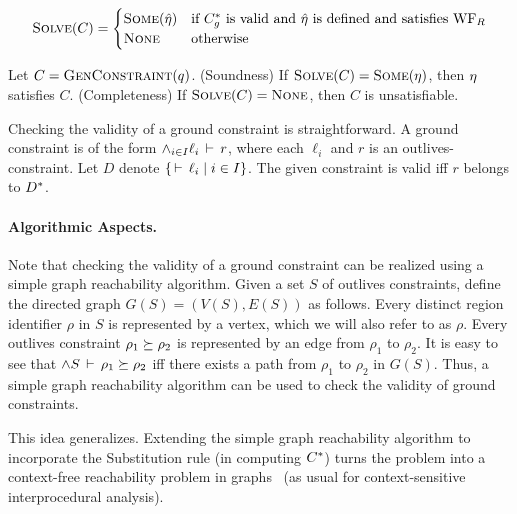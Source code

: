 
\[
\textsc{Solve}(C) = 
\begin{cases}
\textsc{Some} (\hat{\eta}) & \textrm{if ${C}^*_g$ is valid and $\hat{\eta}$ is defined and satisfies $\text{WF}_R$} \\
\textsc{None} & \textrm{otherwise}
\end{cases}
\]

\begin{theorem}
\label{thm:constraint-solver-sc}
Let $C = \textsc{GenConstraint}(q)$.
(Soundness) If $\textsc{Solve}(C) = \textsc{Some}(\eta)$, then $\eta$ satisfies $C$.
(Completeness) If $\textsc{Solve}(C) = \textsc{None}$, then $C$ is unsatisfiable.
\end{theorem}

Checking the validity of a ground constraint is straightforward.
A ground constraint is of the form $\wedge_{i \in I} \ell_i\,\vdash\,r$, where each
$\ell_i$ and $r$ is an outlives-constraint.
Let $D$ denote $\{ \,\vdash\,\ell_i \;|\; i \in I \}$.
The given constraint is valid iff $r$ belongs to ${D}^*$.

\paragraph{Algorithmic Aspects.}
Note that checking the validity of a ground constraint can be realized using
a simple graph reachability algorithm.
%
Given a set $S$ of outlives constraints, define the directed
graph $G(S)=(V(S),E(S))$ as follows.
Every distinct region identifier $\rho$ in $S$ is represented by a vertex,
which we will also refer to as $\rho$.
Every outlives constraint $\rho_1 \succeq \rho_2$ is represented by
an edge from $\rho_1$ to $\rho_2$.
%
%
It is easy to see that $\wedge S\,\vdash\,\rho_1 \succeq \rho_2$ iff
there exists a path from $\rho_1$ to $\rho_2$ in $G(S)$.
%
Thus, a simple graph reachability algorithm can be used to check the validity of
ground constraints.

This idea generalizes.
Extending the simple graph reachability algorithm to incorporate the Substitution rule
(in computing ${C}^*$) turns the problem into a context-free reachability problem in graphs~\cite{Reps:Reachability}
(as usual for context-sensitive interprocedural analysis).

